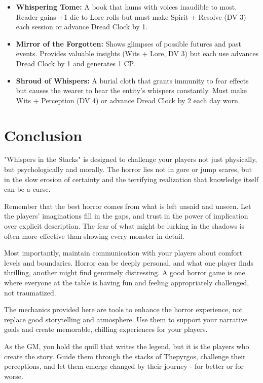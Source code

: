 \documentclass[11pt]{article}
\begin{document}
\begin{itemize}
\item \textbf{Whispering Tome:} A book that hums with voices inaudible to most. Reader gains +1 die to Lore rolls but must make Spirit + Resolve (DV 3) each session or advance Dread Clock by 1.
\item \textbf{Mirror of the Forgotten:} Shows glimpses of possible futures and past events. Provides valuable insights (Wits + Lore, DV 3) but each use advances Dread Clock by 1 and generates 1 CP.
\item \textbf{Shroud of Whispers:} A burial cloth that grants immunity to fear effects but causes the wearer to hear the entity's whispers constantly. Must make Wits + Perception (DV 4) or advance Dread Clock by 2 each day worn.
\end{itemize}

\section{Conclusion}

"Whispers in the Stacks" is designed to challenge your players not just physically, but psychologically and morally. The horror lies not in gore or jump scares, but in the slow erosion of certainty and the terrifying realization that knowledge itself can be a curse.

Remember that the best horror comes from what is left unsaid and unseen. Let the players' imaginations fill in the gaps, and trust in the power of implication over explicit description. The fear of what might be lurking in the shadows is often more effective than showing every monster in detail.

Most importantly, maintain communication with your players about comfort levels and boundaries. Horror can be deeply personal, and what one player finds thrilling, another might find genuinely distressing. A good horror game is one where everyone at the table is having fun and feeling appropriately challenged, not traumatized.

The mechanics provided here are tools to enhance the horror experience, not replace good storytelling and atmosphere. Use them to support your narrative goals and create memorable, chilling experiences for your players.

As the GM, you hold the quill that writes the legend, but it is the players who create the story. Guide them through the stacks of Thepyrgos, challenge their perceptions, and let them emerge changed by their journey - for better or for worse.
\end{document}
